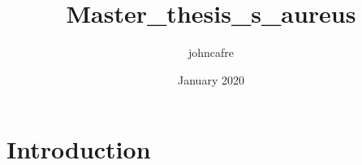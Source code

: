\documentclass{article}
\title{Master_thesis_s_aureus}
\author{johncafre }
\date{January 2020}
\begin{document}
\maketitle

\section{Introduction}
\end{document}

